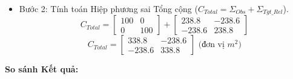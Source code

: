 \begin{itemize}
\begin{itemize}
        \item Hiệp phương sai Đầu vào (Cảm biến): $$ \Sigma_X = \begin{bmatrix} \sigma_\rho^2 & 0 \\ 0 & \sigma_\alpha^2 \end{bmatrix} = \begin{bmatrix} 0.5^2 & 0 \\ 0 & 0.008727^2 \end{bmatrix} = \begin{bmatrix} 0.25 & 0 \\ 0 & 7.616e-5 \end{bmatrix} $$
        \item Hiệp phương sai Tương đối ($\Sigma_{Tgt\_Rel} = J \Sigma_X J^T$):
$$ \Sigma_{Tgt_Rel} = \begin{bmatrix} 0.707 & 1767.8 \\ 0.707 & -1767.8 \end{bmatrix} \begin{bmatrix} 0.25 & 0 \\ 0 & 7.616e-5 \end{bmatrix} \begin{bmatrix} 0.707 & 0.707 \\ 1767.8 & -1767.8 \end{bmatrix} $$       $$ \Sigma_{Tgt_Rel} = \begin{bmatrix} 238.8 & -238.6 \\ -238.6 & 238.8 \end{bmatrix} \text{ (đơn vị } m^2) $$
    \end{itemize}
    \item Bước 2: Tính toán Hiệp phương sai Tổng cộng
    ($C_{Total} = \Sigma_{Obs} + \Sigma_{Tgt\_Rel}$).
$$ C_{Total} = \begin{bmatrix} 100 & 0 \\ 0 & 100 \end{bmatrix} + \begin{bmatrix} 238.8 & -238.6 \\ -238.6 & 238.8 \end{bmatrix} $$   $$ C_{Total} = \begin{bmatrix} 338.8 & -238.6 \\ -238.6 & 338.8 \end{bmatrix} \text{ (đơn vị } m^2) $$
\end{itemize}
\textbf{So sánh Kết quả:}
